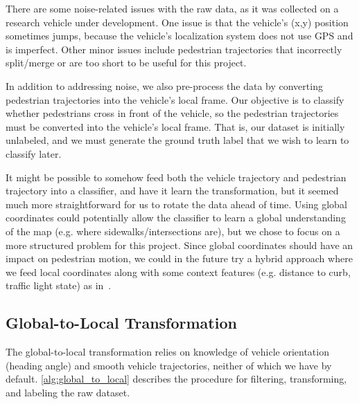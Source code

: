 There are some noise-related issues with the raw data, as it was collected on a research vehicle under development.
One issue is that the vehicle's (x,y) position sometimes jumps, because the vehicle's localization system does not use GPS and is imperfect.
Other minor issues include pedestrian trajectories that incorrectly split/merge or are too short to be useful for this project.

In addition to addressing noise, we also pre-process the data by converting pedestrian trajectories into the vehicle's local frame.
Our objective is to classify whether pedestrians cross in front of the vehicle, so the pedestrian trajectories must be converted into the vehicle's local frame.
That is, our dataset is initially unlabeled, and we must generate the ground truth label that we wish to learn to classify later.

It might be possible to somehow feed both the vehicle trajectory and pedestrian trajectory into a classifier, and have it learn the transformation, but it seemed much more straightforward for us to rotate the data ahead of time.
Using global coordinates could potentially allow the classifier to learn a global understanding of the map (e.g. where sidewalks/intersections are), but we chose to focus on a more structured problem for this project.
Since global coordinates should have an impact on pedestrian motion, we could in the future try a hybrid approach where we feed local coordinates along with some context features (e.g. distance to curb, traffic light state) as in~\cite{casnsc_NIPS}.

\subsection{Global-to-Local Transformation}

The global-to-local transformation relies on knowledge of vehicle orientation (heading angle) and smooth vehicle trajectories, neither of which we have by default.
\cref{alg:global_to_local} describes the procedure for filtering, transforming, and labeling the raw dataset.

